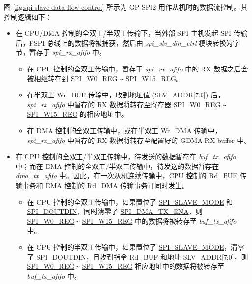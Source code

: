\documentclass[main\_\_CN.tex]{subfiles}
\begin{document}
图 \ref{fig:spi-slave-data-flow-control} 所示为 GP-SPI2 用作从机时的数据流控制。其控制逻辑如下：
\begin{itemize}
    \item 在 CPU/DMA 控制的全双工/半双工传输下，当外部 SPI 主机发起 SPI 传输后，FSPI 总线上的数据将被捕获，然后由 \emph{spi\_slv\_din\_ctrl} 模块转换为字节，暂存于 \emph{spi\_rx\_afifo} 中。
    \begin{itemize}
        \item 在 CPU 控制的全双工传输中，暂存于 \emph{spi\_rx\_afifo} 中的 RX 数据之后会被相继转存到 \hyperref[regdesc:SPIW0REG]{SPI\_W0\_REG} \verb+~+ \hyperref[regdesc:SPIW0REG]{SPI\_W15\_REG}。

        \item 在半双工 \hyperref[cmd:wrbuf]{Wr\_BUF} 传输中，收到地址值 (SLV\_ADDR[7:0]) 后，\emph{spi\_rx\_afifo} 中暂存的 RX 数据将转存至寄存器 \hyperref[regdesc:SPIW0REG]{SPI\_W0\_REG} \verb+~+ \hyperref[regdesc:SPIW0REG]{SPI\_W15\_REG} 的相应地址中。

        \item 在 DMA 控制的全双工传输中，或在半双工 \hyperref[cmd:wrdma]{Wr\_DMA} 传输中，\emph{spi\_rx\_afifo} 中暂存的 RX 数据将转存至配置好的 GDMA RX buffer 中。

    \end{itemize}

    \item 在 CPU 控制的全双工/半双工传输中，待发送的数据暂存在 \emph{buf\_tx\_afifo} 中；而在 DMA 控制的全双工/半双工传输中，待发送的数据暂存在 \emph{dma\_tx\_afifo} 中。因此，在一次从机连续传输中，CPU 控制的 \hyperref[cmd:rdbuf]{Rd\_BUF} 传输事务和 DMA 控制的 \hyperref[cmd:rddma]{Rd\_DMA} 传输事务可同时发生。
    \begin{itemize}
        \item 在 CPU 控制的全双工传输中，如果置位了 \hyperref[fielddesc:SPISLAVEMODE]{SPI\_SLAVE\_MODE} 和 \hyperref[fielddesc:SPIDOUTDIN]{SPI\_DOUTDIN}，同时清零了 \hyperref[fielddesc:SPIDMATXENA]{SPI\_DMA\_TX\_ENA}，则 \hyperref[regdesc:SPIW0REG]{SPI\_W0\_REG} \verb+~+ \hyperref[regdesc:SPIW0REG]{SPI\_W15\_REG} 中的数据将被转存至 \emph{buf\_tx\_afifo} 中。

        \item 在 CPU 控制的半双工传输中，如果置位了 \hyperref[fielddesc:SPISLAVEMODE]{SPI\_SLAVE\_MODE}，清零了 \hyperref[fielddesc:SPIDOUTDIN]{SPI\_DOUTDIN}，且收到指令 \hyperref[cmd:rdbuf]{Rd\_BUF} 和地址 SLV\_ADDR[7:0]，则 \hyperref[regdesc:SPIW0REG]{SPI\_W0\_REG} \verb+~+ \hyperref[regdesc:SPIW0REG]{SPI\_W15\_REG} 相应地址中的数据将被转存至 \emph{buf\_tx\_afifo} 中。


\end{itemize}
\end{itemize}
\end{document}
